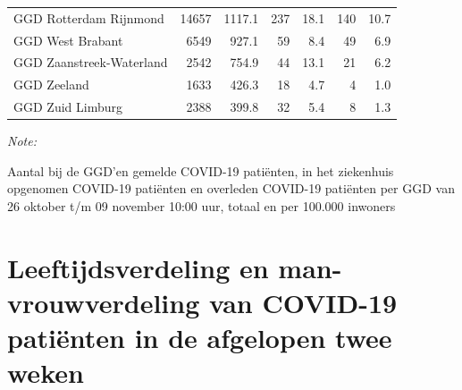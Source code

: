 \documentclass[
  english,
  man,floatsintext]{apa6}
\begin{document}
\begin{table}[H]
\begin{threeparttable}
\begin{tabular}{lrrrrrr}
GGD Rotterdam Rijnmond & 14657 & 1117.1 & 237 & 18.1 & 140 & 10.7\\
GGD West Brabant & 6549 & 927.1 & 59 & 8.4 & 49 & 6.9\\
GGD Zaanstreek-Waterland & 2542 & 754.9 & 44 & 13.1 & 21 & 6.2\\
GGD Zeeland & 1633 & 426.3 & 18 & 4.7 & 4 & 1.0\\
GGD Zuid Limburg & 2388 & 399.8 & 32 & 5.4 & 8 & 1.3\\
\bottomrule
\end{tabular}
\begin{tablenotes}
\item \textit{Note: } 
\item Aantal bij de GGD’en gemelde COVID-19 patiënten, in het ziekenhuis opgenomen COVID-19 patiënten en overleden COVID-19 patiënten per GGD van 26 oktober t/m 09 november 10:00 uur, totaal en per 100.000 inwoners
\end{tablenotes}
\end{threeparttable}
\endgroup{}
\end{table}

\newpage

\hypertarget{leeftijdsverdeling-en-man-vrouwverdeling-van-covid-19-patiuxebnten-in-de-afgelopen-twee-weken}{%
\section{Leeftijdsverdeling en man-vrouwverdeling van COVID-19 patiënten in de afgelopen twee weken}\label{leeftijdsverdeling-en-man-vrouwverdeling-van-covid-19-patiuxebnten-in-de-afgelopen-twee-weken}}
\end{document}
